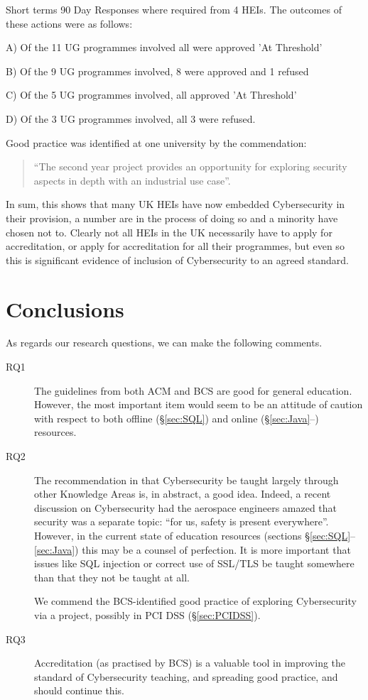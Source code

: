 \documentclass[conference]{IEEEtran}
\begin{document}
Short terms 90 Day Responses where required from 4 HEIs. The outcomes of these actions were as follows:
                                                                        
A)	Of the 11 UG programmes involved all were approved 'At Threshold'

B)	Of the 9 UG programmes involved, 8 were approved and 1 refused

C)	Of the 5 UG programmes involved, all approved 'At Threshold'

D)	Of the 3 UG programmes involved, all 3 were refused.
 
Good practice was identified at one university by the commendation:
 \begin{quote}
``The second year project provides an opportunity for exploring security aspects in depth with an industrial use case''.
\end{quote}
In sum, this shows that many UK HEIs have now embedded Cybersecurity in their provision, a number are in the process of doing so and a minority have chosen not to. Clearly not all HEIs in the UK necessarily have to apply for accreditation, or apply for accreditation for all their programmes, but even so this is significant evidence of inclusion of Cybersecurity to an agreed standard.

\section{Conclusions}
As regards our research questions, we can make the following comments.
\begin{description}
\item[RQ1]The guidelines from both ACM and BCS are good for general education. However, the most important item would seem to be an attitude of caution with respect to both offline (\S\ref{sec:SQL}) and online (\S\ref{sec:Java}--) resources. 
\item[RQ2]The recommendation in \cite[p. 98]{ACM2013a} that Cybersecurity be taught largely through other Knowledge Areas is, in abstract, a good idea. Indeed, a recent discussion on Cybersecurity had the aerospace engineers amazed that security was a separate topic: ``for us, safety is present everywhere''.  However, in the current state of education resources (sections \S\ref{sec:SQL}--\ref{sec:Java}) this may be a counsel of perfection.  It is more important that issues like SQL injection \cite{Drop2019} or correct use of SSL/TLS \cite{Chenetal2019a} be taught somewhere than that they not be taught at all.
\par
We commend the BCS-identified good practice of exploring Cybersecurity via a project, possibly in PCI DSS (\S\ref{sec:PCIDSS}).
\item[RQ3]Accreditation (as practised by BCS) is a valuable tool in improving the standard of Cybersecurity teaching, and spreading good practice, and should continue this.
\end{description}
\end{document}
